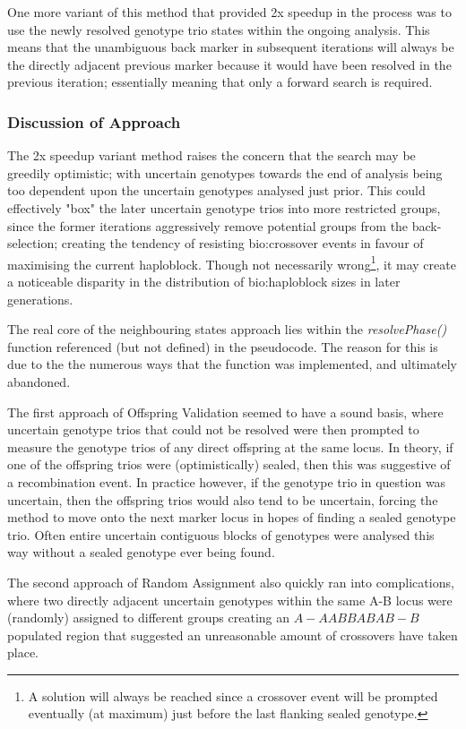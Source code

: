 One more variant of this method that provided 2x speedup in the process was to use the newly resolved genotype trio states within the ongoing analysis. This means that the unambiguous back marker in subsequent iterations will always be the directly adjacent previous marker because it would have been resolved in the previous iteration; essentially meaning that only a forward search is required.

\subsubsection{Discussion of Approach}

The 2x speedup variant method raises the concern that the search may be greedily optimistic; with uncertain genotypes towards the end of analysis being too dependent upon the uncertain genotypes analysed just prior. This could effectively "box" the later uncertain genotype trios into more restricted groups, since the former iterations aggressively remove potential groups from the back-selection; creating the tendency of resisting \gls{bio:crossover} events in favour of maximising the current haploblock. Though not necessarily wrong\footnote{A solution will always be reached since a crossover event will be prompted eventually (at maximum) just before the last flanking sealed genotype.}, it may create a noticeable disparity in the distribution of \gls{bio:haploblock} sizes in later generations.

The real core of the neighbouring states approach lies within the \textit{resolvePhase()} function referenced (but not defined) in the pseudocode. The reason for this is due to the the numerous ways that the function was implemented, and ultimately abandoned.

The first approach of Offspring Validation seemed to have a sound basis, where uncertain genotype trios that could not be resolved were then prompted to measure the genotype trios of any direct offspring at the same locus. In theory, if one of the offspring trios were (optimistically) sealed, then this was suggestive of a recombination event. In practice however, if the genotype trio in question was uncertain, then the offspring trios would also tend to be uncertain, forcing the method to move onto the next marker locus in hopes of finding a sealed genotype trio. Often entire uncertain contiguous blocks of genotypes were analysed this way without a sealed genotype ever being found.

The second approach of Random Assignment also quickly ran into complications, where two directly adjacent uncertain genotypes within the same A-B locus were (randomly) assigned to different groups creating an $A-AABBABAB-B$ populated region that suggested an unreasonable amount of crossovers have taken place.

